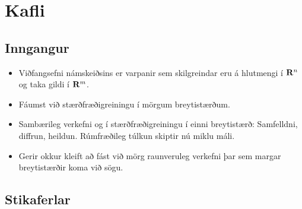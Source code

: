 
\theoremstyle{definition}
\newtheorem{exercise}[theorem]{}





\newbox\mytempbox
\newdimen\mytempdimen

\newcommand\includegraphicscopyright[3][]{%
  \leavevmode\vbox{\vskip3pt\raggedright\setbox\mytempbox=\hbox{\texttt{[image: \#2]}}%
    \mytempdimen=\wd\mytempbox\box\mytempbox\par\vskip1pt%
    \fontsize{3}{3.5}\selectfont{\color{black!25}{\vbox{\hsize=\mytempdimen#3}}}\vskip3pt%
}}

\newenvironment{colortabular}[1]{\medskip\rowcolors[]{1}{blue!20}{blue!10}\tabular{#1}\rowcolor{blue!40}}{\endtabular\medskip}

\def\equad{\leavevmode\hbox{}\quad}

\newenvironment{greencolortabular}[1]
{\medskip\rowcolors[]{1}{green!50!black!20}{green!50!black!10}%
  \tabular{#1}\rowcolor{green!50!black!40}}%
{\endtabular\medskip}




\section{Kafli}
\subsection{Inngangur}
\begin {itemize}
 \item Viðfangsefni námskeiðsins er varpanir sem skilgreindar eru á
hlutmengi í $\mbox{${\bf R}^n$}$ og taka gildi í $\mbox{${\bf R}^m$}$. 
\item Fáumst við stærðfræðigreiningu í mörgum breytistærðum.
\item Sambærileg verkefni og í stærðfræðigreiningu í einni breytistærð: Samfelldni, diffrun, heildun. Rúmfræðileg túlkun skiptir nú miklu máli.
\item 
Gerir okkur kleift að fást við mörg raunveruleg verkefni þar sem margar breytistærðir koma við sögu.
\end {itemize}




\subsection{Stikaferlar} 

